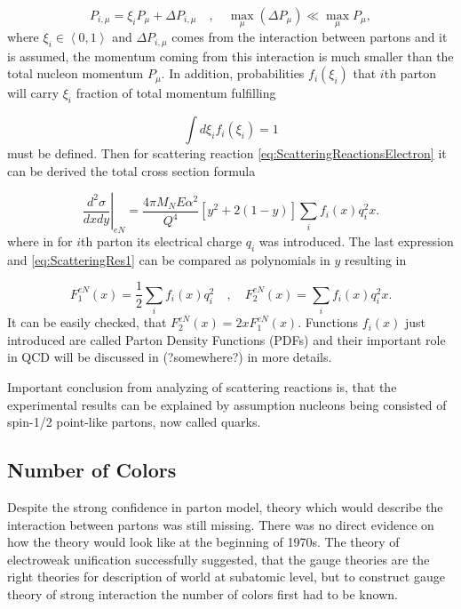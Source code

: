 \documentclass[a4paper,11pt]{report}
\begin{document}
\begin{equation}
  P_{i,\mu} = \xi_i P_\mu + \Delta P_{i,\mu} 
    \quad , \quad \max_\mu (\Delta P_\mu) \ll \max_\mu P_\mu,
  \label{PartonsMomentumDistriburtionAssumption}
\end{equation}
where $\xi_i \in \left< 0, 1 \right>$ and $\Delta P_{i,\mu}$ comes from the
interaction between partons and it is assumed, the momentum coming from this
interaction is much smaller than the total nucleon momentum $P_\mu$. In
addition, probabilities $f_i(\xi_i)$ that $i$th parton will carry $\xi_i$
fraction of total momentum fulfilling

\begin{equation}
  \int d\xi_i f_i(\xi_i) = 1
  \label{PartonDensityFunctionsNormalization}
\end{equation}
must be defined. Then for scattering reaction
\eqref{eq:ScatteringReactionsElectron} it can be derived the total cross section
formula

\begin{equation}
  \left. \frac{d^2\sigma}{dxdy} \right|_{eN} =
  \frac{4 \pi M_N E \alpha^2}{Q^4} \left[ y^2 + 2 ( 1 - y ) \right]
  \sum_i f_i(x) q_i^2 x.
  \label{eg:ScatteringRes2}
\end{equation}
where in for $i$th parton its electrical charge $q_i$ was introduced. The last
expression and \eqref{eq:ScatteringRes1} can be compared as polynomials in $y$
resulting in

\begin{equation}
  F_1^{eN}(x) = \frac{1}{2} \sum_i f_i(x)q_i^2
  \quad , \quad
  F_2^{eN}(x) = \sum_i f_i(x) q_i^2 x.
  \label{eq:StructureFunctionAndPDF}
\end{equation}
It can be easily checked, that $F_2^{eN}(x) = 2 x F_1^{eN}(x)$. Functions
$f_i(x)$ just introduced are called Parton Density Functions (PDFs) and their
important role in QCD will be discussed in (?somewhere?) in more details.

Important conclusion from analyzing of scattering reactions is, that the
experimental results can be explained by assumption nucleons being consisted of
spin-1/2 point-like partons, now called quarks. 

\subsection{Number of Colors}

Despite the strong confidence in parton model, theory which would describe the
interaction between partons was still missing. There was no direct evidence on
how the theory would look like at the beginning of 1970s. The theory of electroweak
unification successfully suggested, that the gauge theories are the right
theories for description of world at subatomic level, but to construct gauge
theory of strong interaction the number of colors first had to be known.
\end{document}
